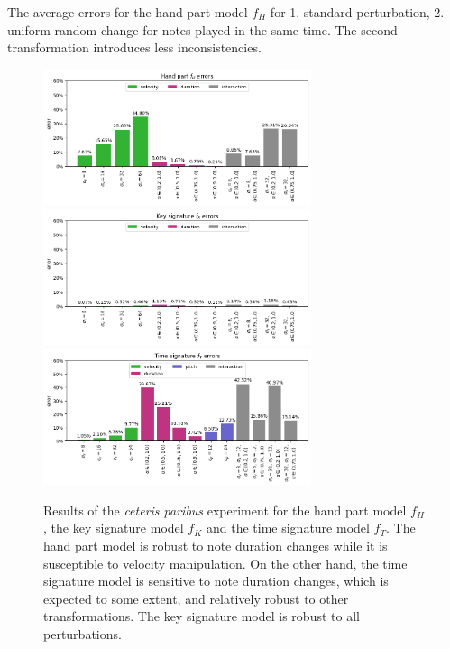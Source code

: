 \begin{table}[ht!]

\caption[The average errors for the hand part model]{The average errors for the hand part model $f_H$ for 1. standard perturbation, 2. uniform random change for notes played in the same time. The second transformation introduces less inconsistencies.}
\label{hand_part_perturbations}
\end{table} 

\begin{figure}[!ht]
\centering
\includegraphics[width=0.7\textwidth]{images/ceteris_paribus_results_h.png}
\includegraphics[width=0.7\textwidth]{images/ceteris_paribus_results_k.png}
\includegraphics[width=0.7\textwidth]{images/ceteris_paribus_results_t.png}
\caption[Results of the \emph{ceteris paribus} experiment]{Results of the \emph{ceteris paribus} experiment for the hand part model $f_H$, the key signature model $f_K$ and the time signature model $f_T$. The hand part model is robust to note duration changes while it is susceptible to velocity manipulation. On the other hand, the time signature model is sensitive to note duration changes, which is expected to some extent, and relatively robust to other transformations. The key signature model is robust to all perturbations.}
\label{ceteris_paribus}
\end{figure}

